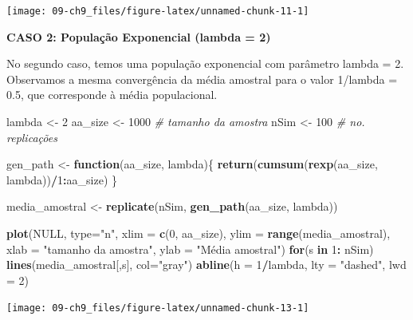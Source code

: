 \documentclass[
]{book}
\newenvironment{Shaded}{\begin{snugshade}}{\end{snugshade}}
\newcommand{\CommentTok}[1]{\textcolor[rgb]{0.56,0.35,0.01}{\textit{#1}}}
\newcommand{\ControlFlowTok}[1]{\textcolor[rgb]{0.13,0.29,0.53}{\textbf{#1}}}
\newcommand{\DataTypeTok}[1]{\textcolor[rgb]{0.13,0.29,0.53}{#1}}
\newcommand{\DecValTok}[1]{\textcolor[rgb]{0.00,0.00,0.81}{#1}}
\newcommand{\KeywordTok}[1]{\textcolor[rgb]{0.13,0.29,0.53}{\textbf{#1}}}
\newcommand{\NormalTok}[1]{#1}
\newcommand{\OperatorTok}[1]{\textcolor[rgb]{0.81,0.36,0.00}{\textbf{#1}}}
\newcommand{\OtherTok}[1]{\textcolor[rgb]{0.56,0.35,0.01}{#1}}
\newcommand{\StringTok}[1]{\textcolor[rgb]{0.31,0.60,0.02}{#1}}
\theoremstyle{definition}
\theoremstyle{definition}
\theoremstyle{definition}
\theoremstyle{remark}
\begin{document}
\begin{center}\texttt{[image: 09-ch9\_files/figure-latex/unnamed-chunk-11-1]} \end{center}

\textbf{CASO 2: População Exponencial (lambda = 2)}

No segundo caso, temos uma população exponencial com parâmetro lambda = 2. Observamos a mesma convergência da média amostral para o valor 1/lambda = 0.5, que corresponde à média populacional.

\begin{Shaded}
\begin{Highlighting}[]
\NormalTok{lambda  <-}\StringTok{ }\DecValTok{2}
\NormalTok{aa_size <-}\StringTok{ }\DecValTok{1000}   \CommentTok{# tamanho da amostra}
\NormalTok{nSim    <-}\StringTok{ }\DecValTok{100}    \CommentTok{# no. replicações}

\NormalTok{gen_path <-}\StringTok{ }\ControlFlowTok{function}\NormalTok{(aa_size, lambda)\{}
  \KeywordTok{return}\NormalTok{(}\KeywordTok{cumsum}\NormalTok{(}\KeywordTok{rexp}\NormalTok{(aa_size, lambda))}\OperatorTok{/}\DecValTok{1}\OperatorTok{:}\NormalTok{aa_size)}
\NormalTok{\}}
  
\NormalTok{media_amostral <-}\StringTok{ }\KeywordTok{replicate}\NormalTok{(nSim, }\KeywordTok{gen_path}\NormalTok{(aa_size, lambda))}

\KeywordTok{plot}\NormalTok{(}\OtherTok{NULL}\NormalTok{, }\DataTypeTok{type=}\StringTok{"n"}\NormalTok{, }
     \DataTypeTok{xlim =} \KeywordTok{c}\NormalTok{(}\DecValTok{0}\NormalTok{, aa_size), }
     \DataTypeTok{ylim =} \KeywordTok{range}\NormalTok{(media_amostral),}
     \DataTypeTok{xlab =} \StringTok{"tamanho da amostra"}\NormalTok{,}
     \DataTypeTok{ylab =} \StringTok{"Média amostral"}\NormalTok{)}
\ControlFlowTok{for}\NormalTok{(s }\ControlFlowTok{in} \DecValTok{1}\OperatorTok{:}\StringTok{ }\NormalTok{nSim) }\KeywordTok{lines}\NormalTok{(media_amostral[,s], }\DataTypeTok{col=}\StringTok{"gray"}\NormalTok{)}
\KeywordTok{abline}\NormalTok{(}\DataTypeTok{h =} \DecValTok{1}\OperatorTok{/}\NormalTok{lambda, }\DataTypeTok{lty =} \StringTok{"dashed"}\NormalTok{, }\DataTypeTok{lwd =} \DecValTok{2}\NormalTok{)}
\end{Highlighting}
\end{Shaded}

\begin{center}\texttt{[image: 09-ch9\_files/figure-latex/unnamed-chunk-13-1]} \end{center}
\end{document}
